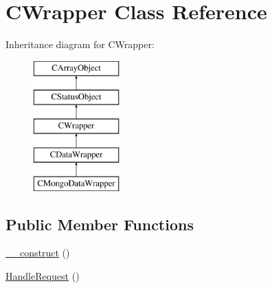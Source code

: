 \hypertarget{class_c_wrapper}{\section{C\-Wrapper Class Reference}
\label{class_c_wrapper}
}
Inheritance diagram for C\-Wrapper\-:\begin{figure}[H]
\begin{center}
\leavevmode
\includegraphics[height=5.000000cm]{class_c_wrapper}
\end{center}
\end{figure}
\subsection*{Public Member Functions}
\begin{DoxyCompactItemize}
\item 
\hyperlink{class_c_wrapper_a683094b01e0682fd34926562d7a052e0}{\-\_\-\-\_\-construct} ()
\item 
\hyperlink{class_c_wrapper_a0e605ca2cdd718ecdeb6f3be9b1f0162}{Handle\-Request} ()
\end{DoxyCompactItemize}
